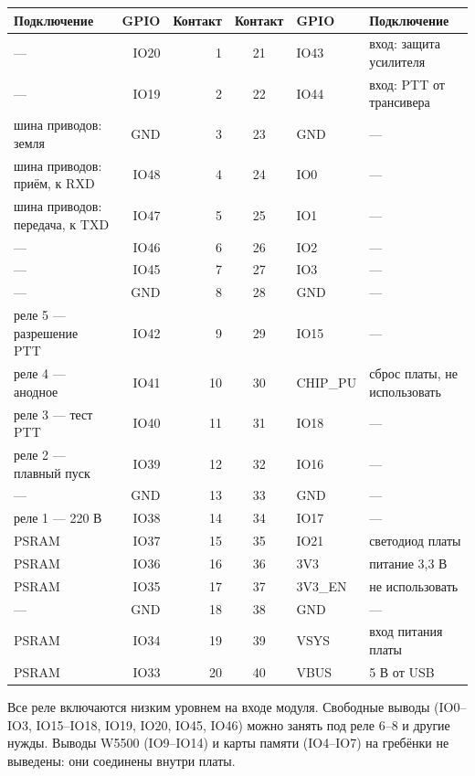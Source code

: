 \documentclass[a4paper,11pt]{article}
\begin{document}
{\small
\begin{center}
\begin{tabularx}{\textwidth}{@{}X r r c l X@{}}
\toprule
\textbf{Подключение} & \textbf{GPIO} & \textbf{Контакт} & \textbf{Контакт} & \textbf{GPIO} & \textbf{Подключение} \\
\midrule
--- & IO20 & 1 & 21 & IO43 & вход: защита усилителя \\
--- & IO19 & 2 & 22 & IO44 & вход: PTT от трансивера \\
шина приводов: земля & GND & 3 & 23 & GND & --- \\
шина приводов: приём, к RXD & IO48 & 4 & 24 & IO0 & --- \\
шина приводов: передача, к TXD & IO47 & 5 & 25 & IO1 & --- \\
--- & IO46 & 6 & 26 & IO2 & --- \\
--- & IO45 & 7 & 27 & IO3 & --- \\
--- & GND & 8 & 28 & GND & --- \\
реле 5 — разрешение PTT & IO42 & 9 & 29 & IO15 & --- \\
реле 4 — анодное & IO41 & 10 & 30 & CHIP\_PU & сброс платы, не использовать \\
реле 3 — тест PTT & IO40 & 11 & 31 & IO18 & --- \\
реле 2 — плавный пуск & IO39 & 12 & 32 & IO16 & --- \\
--- & GND & 13 & 33 & GND & --- \\
реле 1 — 220 В & IO38 & 14 & 34 & IO17 & --- \\
PSRAM & IO37 & 15 & 35 & IO21 & светодиод платы \\
PSRAM & IO36 & 16 & 36 & 3V3 & питание 3,3 В \\
PSRAM & IO35 & 17 & 37 & 3V3\_EN & не использовать \\
--- & GND & 18 & 38 & GND & --- \\
PSRAM & IO34 & 19 & 39 & VSYS & вход питания платы \\
PSRAM & IO33 & 20 & 40 & VBUS & 5 В от USB \\
\bottomrule
\end{tabularx}
\end{center}
}

Все реле включаются низким уровнем на входе модуля. Свободные выводы (IO0--IO3, IO15--IO18, IO19, IO20,
IO45, IO46) можно занять под реле 6--8 и другие нужды. Выводы W5500 (IO9--IO14) и карты памяти
(IO4--IO7) на гребёнки не выведены: они соединены внутри платы.
\end{document}
